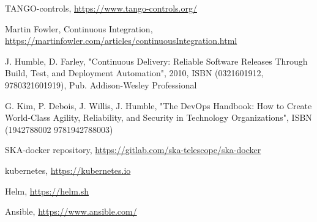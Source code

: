 \documentclass[a4paper,
               keeplastbox,   %
               ]{jacow}
\begin{document}
%
%
%
	{\printbibliography}%
	{%
	
	\begin{thebibliography}{9} %
	
		TANGO-controls,
		\url{https://www.tango-controls.org/}
	
		Martin Fowler, Continuous Integration,
		\url{https://martinfowler.com/articles/continuousIntegration.html}
		
	    J. Humble, D. Farley, "Continuous Delivery: Reliable Software Releases Through Build, Test, and Deployment Automation",
	    2010, ISBN (0321601912, 9780321601919), Pub. Addison-Wesley Professional
	
	    G. Kim, P. Debois, J. Willis, J. Humble, "The DevOps Handbook: How to Create World-Class Agility, Reliability, and Security in Technology Organizations", ISBN (1942788002 9781942788003)
	
		SKA-docker repository,
		\url{https://gitlab.com/ska-telescope/ska-docker}
	
		kubernetes,
		\url{https://kubernetes.io}
			
		Helm,
		\url{https://helm.sh}
		
	    Ansible, \url{https://www.ansible.com/}

	\end{thebibliography}
} %
%
% 

\end{document}
